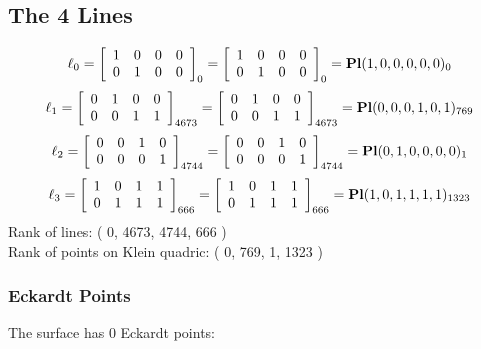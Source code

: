 \documentclass{article}
\begin{document}
{\subsection*{The 4 Lines}
$$
\ell_{0} = 
\left[
\begin{array}{*{4}{r}}
1 & 0 & 0 & 0\\
0 & 1 & 0 & 0\\
\end{array}
\right]
_{0}
=
\left[
\begin{array}{*{4}c}
1  & 0  & 0  & 0\\
0  & 1  & 0  & 0\\
\end{array}
\right]_{0}
={\rm\bf Pl}(1,0,0,0,0,0 )_{0}$$
$$
\ell_{1} = 
\left[
\begin{array}{*{4}{r}}
0 & 1 & 0 & 0\\
0 & 0 & 1 & 1\\
\end{array}
\right]
_{4673}
=
\left[
\begin{array}{*{4}c}
0  & 1  & 0  & 0\\
0  & 0  & 1  & 1\\
\end{array}
\right]_{4673}
={\rm\bf Pl}(0,0,0,1,0,1 )_{769}$$
$$
\ell_{2} = 
\left[
\begin{array}{*{4}{r}}
0 & 0 & 1 & 0\\
0 & 0 & 0 & 1\\
\end{array}
\right]
_{4744}
=
\left[
\begin{array}{*{4}c}
0  & 0  & 1  & 0\\
0  & 0  & 0  & 1\\
\end{array}
\right]_{4744}
={\rm\bf Pl}(0,1,0,0,0,0 )_{1}$$
$$
\ell_{3} = 
\left[
\begin{array}{*{4}{r}}
1 & 0 & 1 & 1\\
0 & 1 & 1 & 1\\
\end{array}
\right]
_{666}
=
\left[
\begin{array}{*{4}c}
1  & 0  & 1  & 1\\
0  & 1  & 1  & 1\\
\end{array}
\right]_{666}
={\rm\bf Pl}(1,0,1,1,1,1 )_{1323}$$
Rank of lines: ( 0, 4673, 4744, 666 )\\
Rank of points on Klein quadric: ( 0, 769, 1, 1323 )\\
\subsubsection*{Eckardt Points}
The surface has 0 Eckardt points:\\
}
\end{document}
